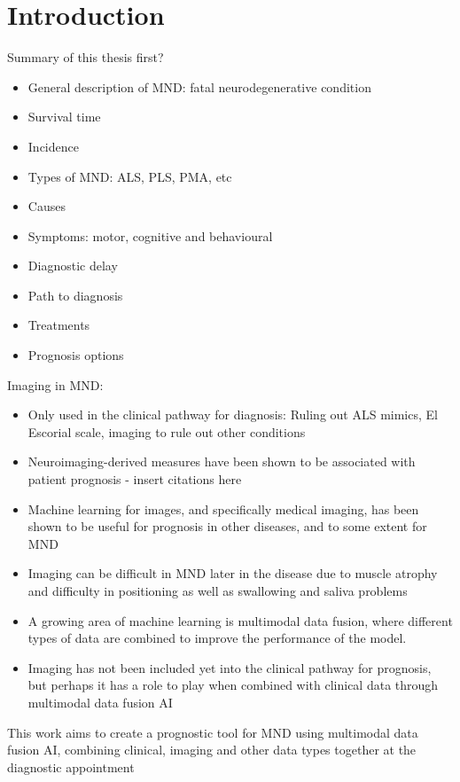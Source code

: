\chapter{Introduction}
\label{introduction}

Summary of this thesis first?

\begin{itemize}
    \item General description of MND: fatal neurodegenerative condition
    \item Survival time
    \item Incidence
    \item Types of MND: ALS, PLS, PMA, etc
    \item Causes
    \item Symptoms: motor, cognitive and behavioural
    \item Diagnostic delay
    \item Path to diagnosis
    \item Treatments
    \item Prognosis options
\end{itemize}

\noindent Imaging in MND:
\begin{itemize}
    \item Only used in the clinical pathway for diagnosis: Ruling out ALS mimics, El Escorial scale, imaging to rule out other conditions
    \item Neuroimaging-derived measures have been shown to be associated with patient prognosis - insert citations here
    \item Machine learning for images, and specifically medical imaging, has been shown to be useful for prognosis in other diseases, and to some extent for MND
    \item Imaging can be difficult in MND later in the disease due to muscle atrophy and difficulty in positioning as well as swallowing and saliva problems
    \item A growing area of machine learning is multimodal data fusion, where different types of data are combined to improve the performance of the model.
    \item Imaging has not been included yet into the clinical pathway for prognosis, but perhaps it has a role to play when combined with clinical data through multimodal data fusion AI
\end{itemize}


This work aims to create a prognostic tool for MND using multimodal data fusion AI, combining clinical, imaging and other data types together at the diagnostic appointment


